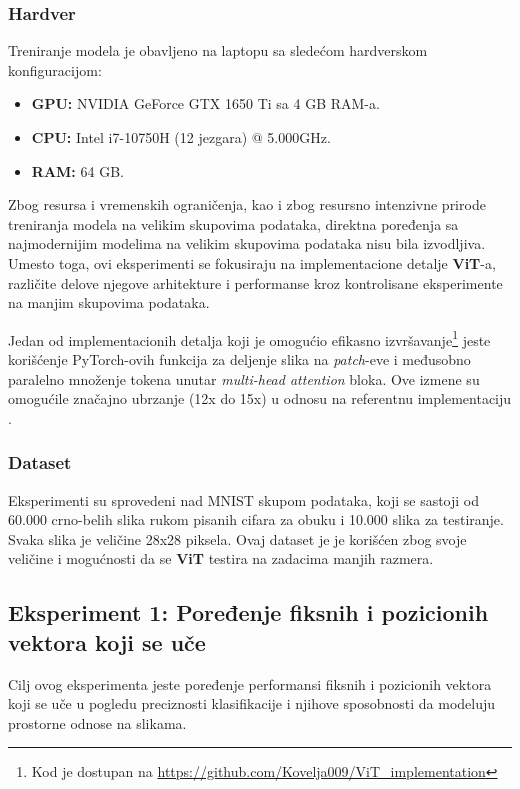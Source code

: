 \documentclass[12pt]{article}
\begin{document}
   \newpage

   \subsubsection{Hardver}
   Treniranje modela je obavljeno na laptopu sa sledećom hardverskom konfiguracijom:
   \begin{itemize}
      \vspace{-0.5cm}
      \setlength\itemsep{0.2em} %
      \item \textbf{GPU:} NVIDIA GeForce GTX 1650 Ti sa 4 GB RAM-a.
      \item \textbf{CPU:} Intel i7-10750H (12 jezgara) @ 5.000GHz.
      \item \textbf{RAM:} 64 GB.
   \end{itemize}

   Zbog resursa i vremenskih ograničenja, kao i zbog resursno intenzivne prirode 
   treniranja modela na velikim skupovima podataka, direktna poređenja sa 
   najmodernijim modelima na velikim skupovima podataka nisu bila izvodljiva. Umesto 
   toga, ovi eksperimenti se fokusiraju na implementacione detalje \textbf{ViT}-a, 
   različite delove njegove arhitekture i performanse kroz kontrolisane 
   eksperimente na manjim skupovima podataka.

   Jedan od implementacionih detalja koji je omogućio efikasno izvršavanje\footnote{Kod je dostupan na \url{https://github.com/Kovelja009/ViT_implementation}}
   jeste korišćenje PyTorch-ovih funkcija za 
   deljenje slika na \textit{patch}-eve i međusobno paralelno množenje 
   tokena unutar \textit{multi-head attention} bloka. Ove izmene su omogućile značajno 
   ubrzanje (12x do 15x) u odnosu na referentnu implementaciju \cite{vit_impl}.

   \subsubsection{Dataset}
   Eksperimenti su sprovedeni nad MNIST \cite{mnist} skupom podataka, 
   koji se sastoji od 60.000 crno-belih slika rukom pisanih cifara za obuku i 
   10.000 slika za testiranje. Svaka slika je veličine 28x28 piksela. Ovaj dataset je 
   je korišćen zbog svoje veličine i mogućnosti da se \textbf{ViT} testira na 
   zadacima manjih razmera.

   \subsection{Eksperiment 1: Poređenje fiksnih i pozicionih vektora koji se uče}
   Cilj ovog eksperimenta jeste poređenje performansi fiksnih 
   i pozicionih vektora koji se uče u pogledu preciznosti klasifikacije i 
   njihove sposobnosti da modeluju prostorne odnose na slikama.
\end{document}
